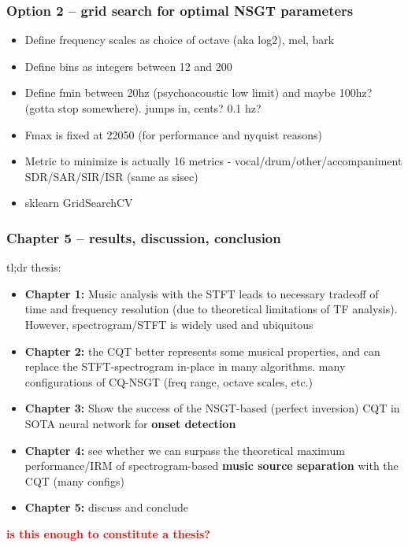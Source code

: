 \documentclass[usenames,dvipsnames]{beamer}
\begin{document}
\begin{frame}
	\frametitle{Option 2 -- grid search for optimal NSGT parameters}
	\begin{itemize}
		\item
			Define frequency scales as choice of octave (aka log2), mel, bark
		\item
			Define bins as integers between 12 and 200
		\item
			Define fmin between 20hz (psychoacoustic low limit) and maybe 100hz? (gotta stop somewhere). jumps in, cents? 0.1 hz?
		\item
			Fmax is fixed at 22050 (for performance and nyquist reasons)
		\item
			Metric to minimize is actually 16 metrics - vocal/drum/other/accompaniment SDR/SAR/SIR/ISR (same as sisec)
		\item
			sklearn GridSearchCV
	\end{itemize}
\end{frame}

\begin{frame}
	\frametitle{Chapter 5 -- results, discussion, conclusion}
	tl;dr thesis:
	\begin{itemize}
		\item
			\textbf{Chapter 1:} Music analysis with the STFT leads to necessary tradeoff of time and frequency resolution (due to theoretical limitations of TF analysis). However, spectrogram/STFT is widely used and ubiquitous
		\item
			\textbf{Chapter 2:} the CQT better represents some musical properties, and can replace the STFT-spectrogram in-place in many algorithms. many configurations of CQ-NSGT (freq range, octave scales, etc.)
		\item
			\textbf{Chapter 3:} Show the success of the NSGT-based (perfect inversion) CQT in SOTA neural network for \textbf{onset detection}
		\item
			\textbf{Chapter 4:} see whether we can surpass the theoretical maximum performance/IRM of spectrogram-based \textbf{music source separation} with the CQT (many configs)
		\item
			\textbf{Chapter 5:} discuss and conclude
	\end{itemize}
	\textcolor{red}{\textbf{is this enough to constitute a thesis?}}
\end{frame}
\end{document}
